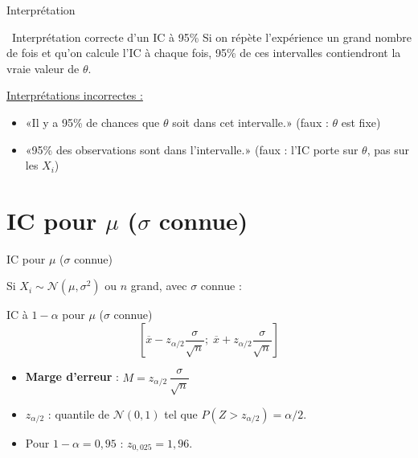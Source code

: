 \documentclass{BeamerTemplate}
\begin{document}
\begin{frame}[t]{Interprétation}

\begin{Boite}{\faInfoCircle\ Interprétation correcte d'un IC à 95\%}
Si on répète l'expérience un grand nombre de fois et qu'on calcule l'IC à chaque fois, \alert{95\% de ces intervalles contiendront} la vraie valeur de $\theta$.
\end{Boite}

\medskip
\underline{Interprétations incorrectes :}
\begin{itemize}\itemsep3mm
  \item «Il y a 95\% de chances que $\theta$ soit dans cet intervalle.» (\alert{faux} : $\theta$ est fixe)
  \item «95\% des observations sont dans l'intervalle.» (\alert{faux} : l'IC porte sur $\theta$, pas sur les $X_i$)
\end{itemize}

\end{frame}

\section{IC pour \texorpdfstring{$\mu$}{mu} (\texorpdfstring{$\sigma$}{sigma} connue)}

\begin{frame}[t]{IC pour $\mu$ ($\sigma$ connue)}

Si $X_i \sim \mathcal{N}(\mu, \sigma^2)$ ou $n$ grand, avec $\sigma$ \alert{connue} :

\begin{Boite}{IC à $1-\alpha$ pour $\mu$ ($\sigma$ connue)}
$$\left[\overline{x} - z_{\alpha/2}\frac{\sigma}{\sqrt{n}};\; \overline{x} + z_{\alpha/2}\frac{\sigma}{\sqrt{n}}\right]$$
\end{Boite}

\medskip
\begin{itemize}\itemsep4mm
  \item \textbf{Marge d'erreur} : $M = z_{\alpha/2}\,\dfrac{\sigma}{\sqrt{n}}$
  \item $z_{\alpha/2}$ : quantile de $\mathcal{N}(0,1)$ tel que $P(Z > z_{\alpha/2}) = \alpha/2$.
  \item Pour $1-\alpha = 0{,}95$ : $z_{0{,}025} = 1{,}96$.
\end{itemize}

\end{frame}
\end{document}
